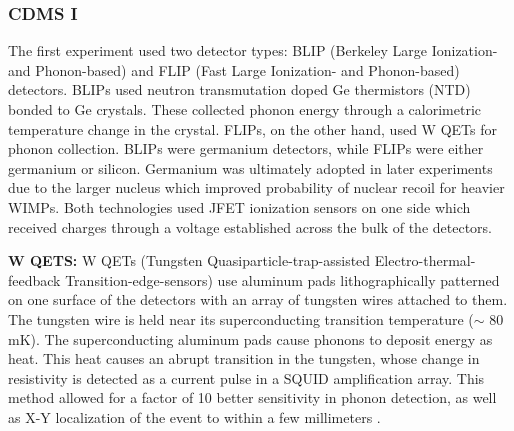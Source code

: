 \documentclass{report}
\begin{document}
\subsubsection{CDMS I}
The first experiment used two detector types: BLIP (Berkeley Large Ionization- and Phonon-based) and FLIP (Fast Large Ionization- and Phonon-based) detectors. BLIPs used neutron transmutation doped Ge thermistors (NTD) bonded to Ge crystals. These collected phonon energy through a calorimetric temperature change in the crystal. FLIPs, on the other hand, used W QETs for phonon collection. BLIPs were germanium detectors, while FLIPs were either germanium or silicon. Germanium was ultimately adopted in later experiments due to the larger nucleus which improved probability of nuclear recoil for heavier WIMPs. Both technologies used JFET ionization sensors on one side which received charges through a voltage established across the bulk of the detectors.

\textbf{W QETS:} W QETs (Tungsten Quasiparticle-trap-assisted Electro-thermal-feedback Transition-edge-sensors) use aluminum pads lithographically patterned on one surface of the detectors with an array of tungsten wires attached to them. The tungsten wire is held near its superconducting transition temperature ($\sim$ 80 mK). The superconducting aluminum pads cause phonons to deposit energy as heat. This heat causes an abrupt transition in the tungsten, whose change in resistivity is detected as a current pulse in a SQUID amplification array. This method allowed for a factor of 10 better sensitivity in phonon detection, as well as X-Y localization of the event to within a few millimeters \cite{Gaitskell1997}.
\end{document}

